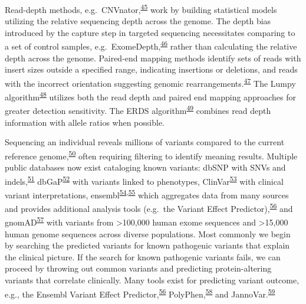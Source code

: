 \documentclass[11pt,letterpaper,oneside]{book}
\begin{document}
Read-depth methods, e.g.~CNVnator,\textsuperscript{\protect\hyperlink{ref-abyzov:2011aa}{45}} work by building statistical models utilizing the relative sequencing depth across the genome.
The depth bias introduced by the capture step in targeted sequencing necessitates comparing to a set of control samples, e.g.~ExomeDepth,\textsuperscript{\protect\hyperlink{ref-plagnol:2012aa}{46}} rather than calculating the relative depth across the genome.
Paired-end mapping methods identify sets of reads with insert sizes outside a specified range, indicating insertions or deletions, and reads with the incorrect orientation suggesting genomic rearrangements.\textsuperscript{\protect\hyperlink{ref-korbel:2007aa}{47}}
The Lumpy algorithm\textsuperscript{\protect\hyperlink{ref-layer:2014aa}{48}} utilizes both the read depth and paired end mapping approaches for greater detection sensitivity.
The ERDS algorithm\textsuperscript{\protect\hyperlink{ref-zhu:2012aa}{49}} combines read depth information with allele ratios when possible.

Sequencing an individual reveals millions of variants compared to the current reference genome,\textsuperscript{\protect\hyperlink{ref-auton:2015aa}{50}} often requiring filtering to identify meaning results.
Multiple public databases now exist cataloging known variants: dbSNP with SNVs and indels,\textsuperscript{\protect\hyperlink{ref-sherry:1999aa}{51}} dbGaP\textsuperscript{\protect\hyperlink{ref-mailman:2007aa}{52}} with variants linked to phenotypes, ClinVar\textsuperscript{\protect\hyperlink{ref-landrum:2014aa}{53}} with clinical variant interpretations, ensembl\textsuperscript{\protect\hyperlink{ref-hubbard:2002aa}{54},\protect\hyperlink{ref-yates:2020aa}{55}} which aggregates data from many sources and provides additional analysis tools (e.g.~the Variant Effect Predictor),\textsuperscript{\protect\hyperlink{ref-mclaren:2016aa}{56}} and gnomAD\textsuperscript{\protect\hyperlink{ref-karczewski:2019aa}{57}} with variants from \textgreater100,000 human exome sequences and \textgreater15,000 human genome sequences across diverse populations.
Most commonly we begin by searching the predicted variants for known pathogenic variants that explain the clinical picture.
If the search for known pathogenic variants fails, we can proceed by throwing out common variants and predicting protein-altering variants that correlate clinically.
Many tools exist for predicting variant outcome, e.g., the Ensembl Variant Effect Predictor,\textsuperscript{\protect\hyperlink{ref-mclaren:2016aa}{56}} PolyPhen,\textsuperscript{\protect\hyperlink{ref-adzhubei:2013aa}{58}} and JannoVar.\textsuperscript{\protect\hyperlink{ref-jager:2014aa}{59}}
\end{document}
